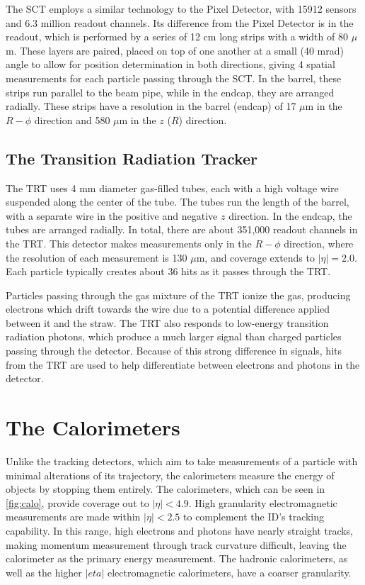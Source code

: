 The \ac{SCT} employs a similar technology to the Pixel Detector, with 15912 sensors and 6.3 million readout channels. Its difference from the Pixel Detector is in the readout, which is performed by a series of 12 cm long strips with a width of 80 $\mu$m. These layers are paired, placed on top of one another at a small (40 mrad) angle to allow for position determination in both directions, giving 4 spatial measurements for each particle passing through the \ac{SCT}. In the barrel, these strips run parallel to the beam pipe, while in the endcap, they are arranged radially. These strips have a resolution in the barrel (endcap) of 17 $\mu$m in the $R-\phi$ direction and 580 $\mu$m in the $z$ ($R$) direction. 

\subsection{The Transition Radiation Tracker}

The \ac{TRT} uses 4 mm diameter gas-filled tubes, each with a high voltage wire suspended along the center of the tube. The tubes run the length of the barrel, with a separate wire in the positive and negative $z$ direction. In the endcap, the tubes are arranged radially. In total, there are about 351,000 readout channels in the \ac{TRT}. This detector makes measurements only in the $R-\phi$ direction, where the resolution of each measurement is 130 $\mu$m, and coverage extends to $|\eta|=2.0$. Each particle typically creates about 36 hits as it passes through the \ac{TRT}. 

Particles passing through the gas mixture of the \ac{TRT} ionize the gas, producing electrons which drift towards the wire due to a potential difference applied between it and the straw. The \ac{TRT} also responds to low-energy transition radiation photons, which produce a much larger signal than charged particles passing through the detector. Because of this strong difference in signals, hits from the \ac{TRT} are used to help differentiate between electrons and photons in the detector.

\section{The Calorimeters}
\label{sec:Calo}

Unlike the tracking detectors, which aim to take measurements of a particle with minimal alterations of its trajectory, the calorimeters measure the energy of objects by stopping them entirely. The calorimeters, which can be seen in \autoref{fig:calo}, provide coverage out to $|\eta| < 4.9$. High granularity electromagnetic measurements are made within $|\eta| < 2.5$ to complement the \ac{ID}'s tracking capability. In this range, high \pt electrons and photons have nearly straight tracks, making momentum measurement through track curvature difficult, leaving the calorimeter as the primary energy measurement. The hadronic calorimeters, as well as the higher $|eta|$ electromagnetic calorimeters, have a coarser granularity. 

